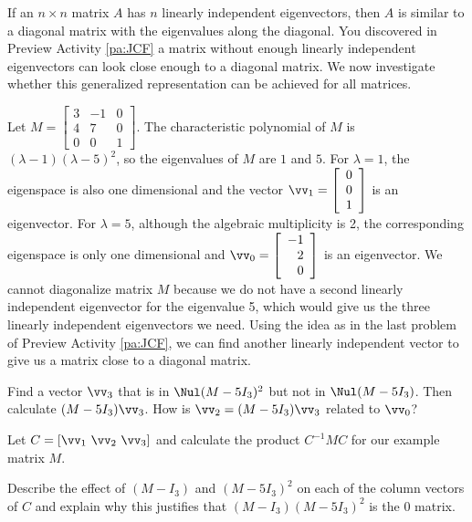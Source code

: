 \label{sec:gen_eigen_jordan}

If an $n \times n$ matrix $A$ has $n$ linearly independent eigenvectors, then $A$ is similar to a diagonal matrix with the eigenvalues along the diagonal. You discovered in Preview Activity \ref{pa:JCF} a matrix without enough linearly independent eigenvectors can look close enough to a diagonal matrix. We now investigate whether this generalized representation can be achieved for all matrices.

\begin{activity} \label{act:JC_intro} Let $M = \left[ \begin{array}{crc} 3 &-1 & 0  \\ 4 & 7 & 0 \\ 0&0&1 \end{array} \right]$. The characteristic polynomial of $M$ is $(\lambda-1)(\lambda - 5)^2$, so the eigenvalues of $M$ are $1$ and $5$. For $\lambda=1$, the eigenspace is also one dimensional and the vector $\vv_1 = \left[ \begin{array}{c} 0 \\ 0 \\ 1 \end{array}\right]$ is an eigenvector. For $\lambda=5$, although the algebraic multiplicity is 2, the corresponding eigenspace is only one dimensional and $\vv_0 = \left[ \begin{array}{r} -1\\2\\0 \end{array}\right]$ is an eigenvector. We cannot diagonalize matrix $M$ because we do not have a second linearly independent eigenvector for the eigenvalue 5, which would give us the three linearly independent eigenvectors we need. Using the idea as in the last problem of Preview Activity \ref{pa:JCF}, we can find another linearly independent vector to give us a matrix close to a diagonal matrix.

\ba
\item Find a vector $\vv_3$ that is in $\Nul (M-5I_3)^2$ but not in $\Nul (M-5I_3)$. Then calculate $(M-5I_3)\vv_3$. How is $\vv_2 = (M-5I_3)\vv_3$ related to $\vv_0$?  

\item  Let $C = [\vv_1 \ \vv_2 \ \vv_3]$ and calculate the product $C^{-1}MC$ for our example matrix $M$. 

\item Describe the effect of $(M-I_3)$ and $(M-5I_3)^2$ on each of the column vectors of $C$ and explain why this justifies that $(M-I_3)(M-5I_3)^2$ is the 0 matrix.


\ea

\end{activity}

